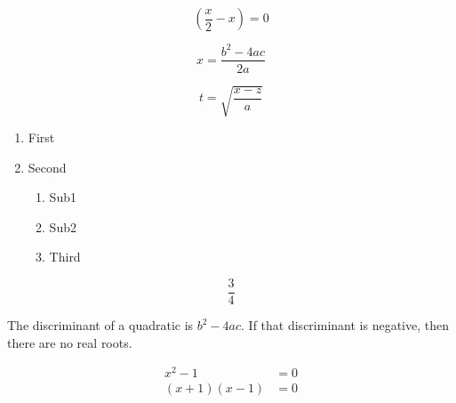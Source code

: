 \documentclass{article}               %
\begin{document}
	
	$$\left( \frac{x}{2} - x \right) = 0$$		%
	
		$$x = \frac{b^2-4ac}{2a}$$					%
		
			$$t = \sqrt{\frac{x-z}{a}}$$				%
			
			\begin{enumerate}                           %
				\item First                             %
				\item Second                            %
				\begin{enumerate}                       %
					\item Sub1                          %
					\item Sub2                          %
					\item Third                         %
				\end{enumerate}
			\end{enumerate}
			
			$$\frac{3}{4}$$                  %
			
			The discriminant of a quadratic is $b^2 - 4ac$.  %
			If that discriminant is negative, then there are no real roots.
			
			
			\begin{align*}                           %
				x^2-1 &= 0 \\                         %
				(x+1)(x-1) &=0                        %
			\end{align*}
			
		
\end{document}
